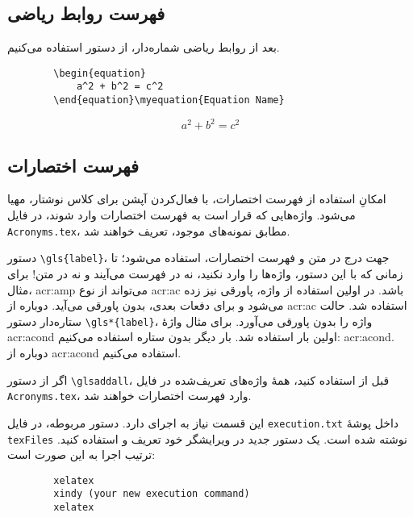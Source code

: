 \subsection{فهرست روابط ریاضی}
بعد از روابط ریاضی شماره‌دار، از دستور
استفاده می‌کنیم.
\begin{latin}
	\begin{verbatim}
		\begin{equation}
		    a^2 + b^2 = c^2
		\end{equation}\myequation{Equation Name}
	\end{verbatim}
\end{latin}
\begin{equation}
	a^2 + b^2 = c^2
\end{equation}%

\ifznuUseAcronyms
\subsection{فهرست اختصارات}
امکانِ استفاده از فهرست اختصارات، با فعال‌کردن آپشن
برای کلاس نوشتار، مهیا می‌شود. واژه‌هایی که قرار است به فهرست اختصارات وارد شوند،
در فایل
\verb|Acronyms.tex|،
مطابق نمونه‌های موجود، تعریف خواهند شد.

دستور
\verb|\gls{label}|،
جهت درج در متن و فهرست اختصارات، استفاده می‌شود؛ تا زمانی که با این دستور، واژه‌ها را وارد نکنید،
نه در فهرست می‌آیند و نه در متن! برای مثال،
\gls{acr:amp}
می‌تواند از نوع
\gls{acr:ac}
باشد. در اولین استفاده از واژه، پاورقی نیز زده می‌شود و برای دفعات بعدی، بدون پاورقی می‌آید.
دوباره از
\gls{acr:ac}
استفاده شد. حالت ستاره‌دار دستور
\verb|\gls*{label}|،
واژه را بدون پاورقی می‌آورد. برای مثال واژهٔ
\gls*{acr:acond}
اولین بار استفاده شد. بار دیگر بدون ستاره استفاده می‌کنیم:
\gls{acr:acond}.
دوباره از
\gls{acr:acond}
استفاده می‌کنیم.

اگر از دستور
\verb|\glsaddall|،
قبل از
\verb||
استفاده کنید، همهٔ واژه‌های تعریف‌شده در فایل
\verb|Acronyms.tex|،
وارد فهرست اختصارات خواهند شد.

این قسمت نیاز به اجرای
دارد. دستور مربوطه، در فایل
\verb|execution.txt|
داخل پوشهٔ
\verb|texFiles|
نوشته شده است. یک دستور جدید در ویرایشگر خود تعریف و استفاده کنید. ترتیب اجرا به این صورت است:
\begin{latin}
	\begin{verbatim}
		xelatex
		xindy (your new execution command)
		xelatex
	\end{verbatim}
\end{latin}
\fi

